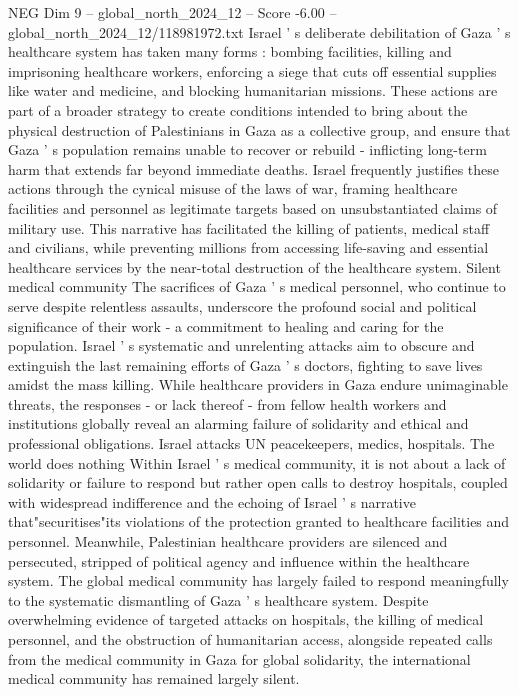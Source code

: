 \begin{textsample}{NEG Dim 9 – global\_north\_2024\_12 – Score -6.00 – global\_north\_2024\_12/118981972.txt}
Israel ' s deliberate debilitation of Gaza ' s healthcare system has taken many forms : bombing facilities, killing and imprisoning healthcare workers, enforcing a siege that cuts off essential supplies like water and medicine, and blocking humanitarian missions.
These actions are part of a broader strategy to create conditions intended to bring about the physical destruction of Palestinians in Gaza as a collective group, and ensure that Gaza ' s population remains unable to recover or rebuild - inflicting long-term harm that extends far beyond immediate deaths.
Israel frequently justifies these actions through the cynical misuse of the laws of war, framing healthcare facilities and personnel as legitimate targets based on unsubstantiated claims of military use.
This narrative has facilitated the killing of patients, medical staff and civilians, while preventing millions from accessing life-saving and essential healthcare services by the near-total destruction of the healthcare system.
Silent medical community The sacrifices of Gaza ' s medical personnel, who continue to serve despite relentless assaults, underscore the profound social and political significance of their work - a commitment to healing and caring for the population.
Israel ' s systematic and unrelenting attacks aim to obscure and extinguish the last remaining efforts of Gaza ' s doctors, fighting to save lives amidst the mass killing.
While healthcare providers in Gaza endure unimaginable threats, the responses - or lack thereof - from fellow health workers and institutions globally reveal an alarming failure of solidarity and ethical and professional obligations.
Israel attacks UN peacekeepers, medics, hospitals.
The world does nothing Within Israel ' s medical community, it is not about a lack of solidarity or failure to respond but rather open calls to destroy hospitals, coupled with widespread indifference and the echoing of Israel ' s narrative that"securitises"its violations of the protection granted to healthcare facilities and personnel.
Meanwhile, Palestinian healthcare providers are silenced and persecuted, stripped of political agency and influence within the healthcare system.
The global medical community has largely failed to respond meaningfully to the systematic dismantling of Gaza ' s healthcare system.
Despite overwhelming evidence of targeted attacks on hospitals, the killing of medical personnel, and the obstruction of humanitarian access, alongside repeated calls from the medical community in Gaza for global solidarity, the international medical community has remained largely silent.

\end{textsample}
